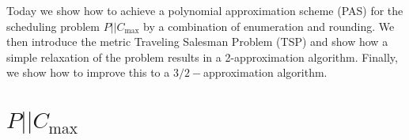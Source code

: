 \documentclass{article}
\begin{document}
%


%
%
%
%

%




Today we show how to achieve a polynomial approximation scheme (PAS)
for the scheduling problem $P || C_{\textrm{max}}$ by a combination of
enumeration and rounding. We then introduce the metric Traveling
Salesman Problem (TSP) and show how a simple relaxation of the problem
results in a 2-approximation algorithm. Finally, we show how to
improve this to a $3/2-$approximation algorithm.


\section{$P || C_{\textrm{max}}$}
\end{document}
